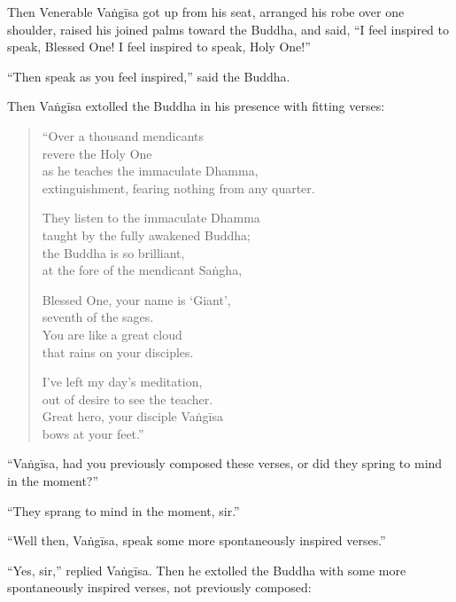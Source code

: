 \documentclass[12pt,openany]{book}%
\begin{document}
Then Venerable \textsanskrit{Vaṅgīsa} got up from his seat, arranged his robe over one shoulder, raised his joined palms toward the Buddha, and said, “I feel inspired to speak, Blessed One! I feel inspired to speak, Holy One!” 

“Then speak as you feel inspired,” said the Buddha. 

Then \textsanskrit{Vaṅgīsa} extolled the Buddha in his presence with fitting verses: 

\begin{verse}%
“Over a thousand mendicants \\
revere the Holy One \\
as he teaches the immaculate Dhamma, \\
extinguishment, fearing nothing from any quarter. 

They listen to the immaculate Dhamma \\
taught by the fully awakened Buddha; \\
the Buddha is so brilliant, \\
at the fore of the mendicant \textsanskrit{Saṅgha}, 

Blessed One, your name is ‘Giant’, \\
seventh of the sages. \\
You are like a great cloud \\
that rains on your disciples. 

I’ve left my day’s meditation, \\
out of desire to see the teacher. \\
Great hero, your disciple \textsanskrit{Vaṅgīsa} \\
bows at your feet.” 

%
\end{verse}

“\textsanskrit{Vaṅgīsa}, had you previously composed these verses, or did they spring to mind in the moment?” 

“They sprang to mind in the moment, sir.” 

“Well then, \textsanskrit{Vaṅgīsa}, speak some more spontaneously inspired verses.” 

“Yes, sir,” replied \textsanskrit{Vaṅgīsa}. Then he extolled the Buddha with some more spontaneously inspired verses, not previously composed: 
\end{document}
